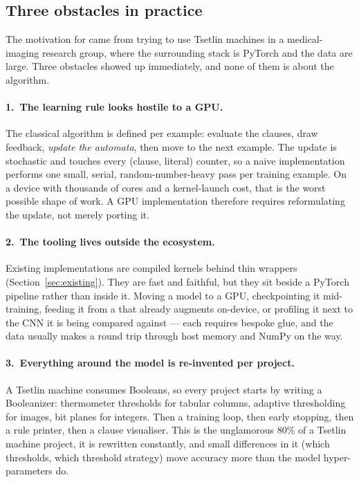 \subsection{Three obstacles in practice}

The motivation for \ttlibname came from trying to use Tsetlin machines in a medical-imaging
research group, where the surrounding stack is PyTorch and the data are large. Three
obstacles showed up immediately, and none of them is about the algorithm.

\paragraph{1.~The learning rule looks hostile to a GPU.}
The classical algorithm is defined per example: evaluate the clauses, draw feedback,
\emph{update the automata}, then move to the next example. The update is stochastic and
touches every (clause, literal) counter, so a naive implementation performs one small,
serial, random-number-heavy pass per training example. On a device with thousands of cores
and a kernel-launch cost, that is the worst possible shape of work. A GPU implementation
therefore requires reformulating the update, not merely porting it.

\paragraph{2.~The tooling lives outside the ecosystem.}
Existing implementations are compiled kernels behind thin wrappers
(Section~\ref{sec:existing}). They are fast and faithful, but they sit beside a PyTorch
pipeline rather than inside it. Moving a model to a GPU, checkpointing it mid-training,
feeding it from a  that already augments on-device, or profiling it next to
the CNN it is being compared against --- each requires bespoke glue, and the data usually
makes a round trip through host memory and NumPy on the way.

\paragraph{3.~Everything around the model is re-invented per project.}
A Tsetlin machine consumes Booleans, so every project starts by writing a Booleanizer:
thermometer thresholds for tabular columns, adaptive thresholding for images, bit planes for
integers. Then a training loop, then early stopping, then a rule printer, then a clause
visualiser. This is the unglamorous 80\% of a Tsetlin machine project, it is rewritten
constantly, and small differences in it (which thresholds, which threshold strategy) move
accuracy more than the model hyper-parameters do.

